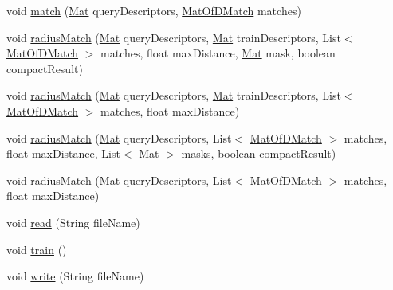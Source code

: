 \begin{DoxyCompactItemize}
\item 
void \mbox{\hyperlink{classorg_1_1opencv_1_1features2d_1_1_descriptor_matcher_aad343fd5829596ee48af551bfade532b}{match}} (\mbox{\hyperlink{classorg_1_1opencv_1_1core_1_1_mat}{Mat}} query\+Descriptors, \mbox{\hyperlink{classorg_1_1opencv_1_1core_1_1_mat_of_d_match}{Mat\+Of\+D\+Match}} matches)
\item 
void \mbox{\hyperlink{classorg_1_1opencv_1_1features2d_1_1_descriptor_matcher_ac2151f66d3a14d78678b3474554cd677}{radius\+Match}} (\mbox{\hyperlink{classorg_1_1opencv_1_1core_1_1_mat}{Mat}} query\+Descriptors, \mbox{\hyperlink{classorg_1_1opencv_1_1core_1_1_mat}{Mat}} train\+Descriptors, List$<$ \mbox{\hyperlink{classorg_1_1opencv_1_1core_1_1_mat_of_d_match}{Mat\+Of\+D\+Match}} $>$ matches, float max\+Distance, \mbox{\hyperlink{classorg_1_1opencv_1_1core_1_1_mat}{Mat}} mask, boolean compact\+Result)
\item 
void \mbox{\hyperlink{classorg_1_1opencv_1_1features2d_1_1_descriptor_matcher_afb838636cf307ab425920d3acfb18076}{radius\+Match}} (\mbox{\hyperlink{classorg_1_1opencv_1_1core_1_1_mat}{Mat}} query\+Descriptors, \mbox{\hyperlink{classorg_1_1opencv_1_1core_1_1_mat}{Mat}} train\+Descriptors, List$<$ \mbox{\hyperlink{classorg_1_1opencv_1_1core_1_1_mat_of_d_match}{Mat\+Of\+D\+Match}} $>$ matches, float max\+Distance)
\item 
void \mbox{\hyperlink{classorg_1_1opencv_1_1features2d_1_1_descriptor_matcher_afb19b0c0b4e476a1cd181cacb11fd327}{radius\+Match}} (\mbox{\hyperlink{classorg_1_1opencv_1_1core_1_1_mat}{Mat}} query\+Descriptors, List$<$ \mbox{\hyperlink{classorg_1_1opencv_1_1core_1_1_mat_of_d_match}{Mat\+Of\+D\+Match}} $>$ matches, float max\+Distance, List$<$ \mbox{\hyperlink{classorg_1_1opencv_1_1core_1_1_mat}{Mat}} $>$ masks, boolean compact\+Result)
\item 
void \mbox{\hyperlink{classorg_1_1opencv_1_1features2d_1_1_descriptor_matcher_adefcd4d38b57790bd4bd5df93f7b2388}{radius\+Match}} (\mbox{\hyperlink{classorg_1_1opencv_1_1core_1_1_mat}{Mat}} query\+Descriptors, List$<$ \mbox{\hyperlink{classorg_1_1opencv_1_1core_1_1_mat_of_d_match}{Mat\+Of\+D\+Match}} $>$ matches, float max\+Distance)
\item 
void \mbox{\hyperlink{classorg_1_1opencv_1_1features2d_1_1_descriptor_matcher_a3f7b8b0f65dd65d0c2169ee33615a6e8}{read}} (String file\+Name)
\item 
void \mbox{\hyperlink{classorg_1_1opencv_1_1features2d_1_1_descriptor_matcher_a6c4da7f3f15fbea1000c509fec8ad1b9}{train}} ()
\item 
void \mbox{\hyperlink{classorg_1_1opencv_1_1features2d_1_1_descriptor_matcher_a9cb97b589f0af378c86f98f2f66c9c6b}{write}} (String file\+Name)
\end{DoxyCompactItemize}
